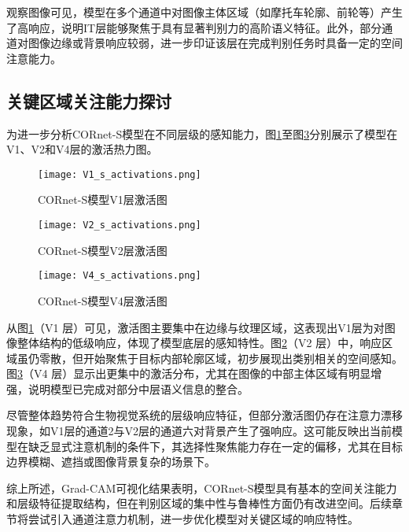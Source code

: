 观察图像可见，模型在多个通道中对图像主体区域（如摩托车轮廓、前轮等）产生了高响应，说明IT层能够聚焦于具有显著判别力的高阶语义特征。此外，部分通道对图像边缘或背景响应较弱，进一步印证该层在完成判别任务时具备一定的空间注意能力。

\subsection{关键区域关注能力探讨}

为进一步分析CORnet-S模型在不同层级的感知能力，图\ref{f.v1_s_act}至图\ref{f.v4_s_act}分别展示了模型在V1、V2和V4层的激活热力图。

\begin{figure}[hbt]
	\centering
	\texttt{[image: V1\_s\_activations.png]}
	\caption{CORnet-S模型V1层激活图}
	\label{f.v1_s_act}
\end{figure}

\begin{figure}[hbt]
	\centering
	\texttt{[image: V2\_s\_activations.png]}
	\caption{CORnet-S模型V2层激活图}
	\label{f.v2_s_act}
\end{figure}

\begin{figure}[hbt]
	\centering
	\texttt{[image: V4\_s\_activations.png]}
	\caption{CORnet-S模型V4层激活图}
	\label{f.v4_s_act}
\end{figure}

从图\ref{f.v1_s_act}（V1 层）可见，激活图主要集中在边缘与纹理区域，这表现出V1层为对图像整体结构的低级响应，体现了模型底层的感知特性。图\ref{f.v2_s_act}（V2 层）中，响应区域虽仍零散，但开始聚焦于目标内部轮廓区域，初步展现出类别相关的空间感知。图\ref{f.v4_s_act}（V4 层）显示出更集中的激活分布，尤其在图像的中部主体区域有明显增强，说明模型已完成对部分中层语义信息的整合。

尽管整体趋势符合生物视觉系统的层级响应特征，但部分激活图仍存在注意力漂移现象，如V1层的通道2与V2层的通道六对背景产生了强响应。这可能反映出当前模型在缺乏显式注意机制的条件下，其选择性聚焦能力存在一定的偏移，尤其在目标边界模糊、遮挡或图像背景复杂的场景下。

综上所述，Grad-CAM可视化结果表明，CORnet-S模型具有基本的空间关注能力和层级特征提取结构，但在判别区域的集中性与鲁棒性方面仍有改进空间。后续章节将尝试引入通道注意力机制，进一步优化模型对关键区域的响应特性。

